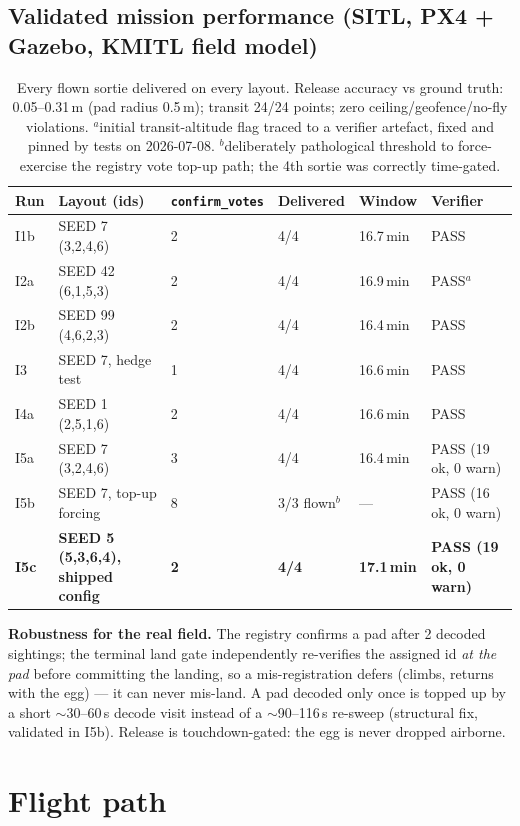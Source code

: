 \documentclass[11pt,a4paper]{article}
\begin{document}
\subsection{Validated mission performance (SITL, PX4 + Gazebo, KMITL field model)}
\begin{table}[H]\centering\small
\begin{tabular}{@{}llllll@{}}
\toprule
Run & Layout (ids) & \texttt{confirm\_votes} & Delivered & Window & Verifier \\
\midrule
I1b & SEED 7 (3,2,4,6) & 2 & 4/4 & 16.7\,min & PASS \\
I2a & SEED 42 (6,1,5,3) & 2 & 4/4 & 16.9\,min & PASS$^{a}$ \\
I2b & SEED 99 (4,6,2,3) & 2 & 4/4 & 16.4\,min & PASS \\
I3  & SEED 7, hedge test & 1 & 4/4 & 16.6\,min & PASS \\
I4a & SEED 1 (2,5,1,6) & 2 & 4/4 & 16.6\,min & PASS \\
I5a & SEED 7 (3,2,4,6) & 3 & 4/4 & 16.4\,min & PASS (19 ok, 0 warn) \\
I5b & SEED 7, top-up forcing & 8 & 3/3 flown$^{b}$ & --- & PASS (16 ok, 0 warn) \\
\textbf{I5c} & \textbf{SEED 5 (5,3,6,4), shipped config} & \textbf{2} & \textbf{4/4} & \textbf{17.1\,min} & \textbf{PASS (19 ok, 0 warn)} \\
\bottomrule
\end{tabular}
\caption{Every flown sortie delivered on every layout. Release accuracy vs
ground truth: 0.05--0.31\,m (pad radius 0.5\,m); transit 24/24 points; zero
ceiling/geofence/no-fly violations. $^{a}$initial transit-altitude flag traced
to a verifier artefact, fixed and pinned by tests on 2026-07-08.
$^{b}$deliberately pathological threshold to force-exercise the registry
vote top-up path; the 4th sortie was correctly time-gated.}
\end{table}

\textbf{Robustness for the real field.} The registry confirms a pad after 2
decoded sightings; the terminal land gate independently re-verifies the
assigned id \emph{at the pad} before committing the landing, so a
mis-registration defers (climbs, returns with the egg) --- it can never
mis-land. A pad decoded only once is topped up by a short $\sim$30--60\,s
decode visit instead of a $\sim$90--116\,s re-sweep (structural fix, validated
in I5b). Release is touchdown-gated: the egg is never dropped airborne.

\clearpage
\section{Flight path}
\end{document}
